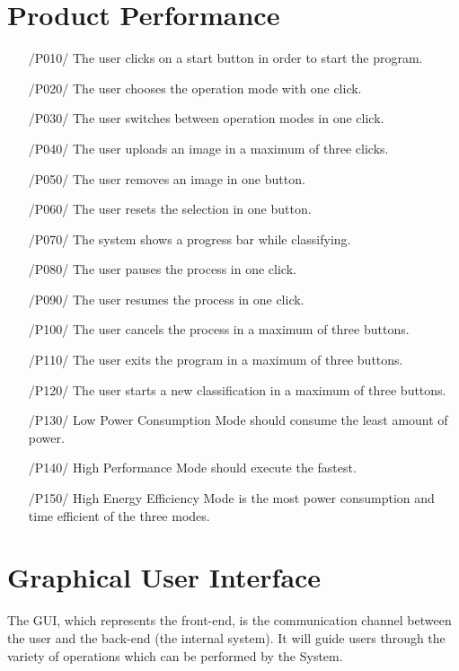 \documentclass[parskip=full]{scrartcl}
\begin{document}
\section{Product Performance}

\begin{itemize}
	\item[/P010/] The user clicks on a start button in order to start the program.
	\item[/P020/] The user chooses the operation mode with one click.
	\item[/P030/] The user switches between operation modes in one click.
	\item[/P040/] The user uploads an image in a maximum of three clicks.
	\item[/P050/] The user removes an image in one button.
	\item[/P060/] The user resets the selection in one button.
	\item[/P070/] The system shows a progress bar while classifying.
	\item[/P080/] The user pauses the process in one click.
	\item[/P090/] The user resumes the process in one click.
	\item[/P100/] The user cancels the process in a maximum of three buttons.
	\item[/P110/] The user exits the program in a maximum of three buttons.
	\item[/P120/] The user starts a new classification in a maximum of three buttons.
	\item[/P130/] Low Power Consumption Mode should consume the least amount of power.
	\item[/P140/] High Performance Mode should execute the fastest.
	\item[/P150/] High Energy Efficiency Mode is the most power consumption and time efficient of the three modes.
\end{itemize}

\pagebreak






\section {Graphical User Interface}

The GUI, which represents the front-end, is the communication channel between the user and the back-end (the internal system). It will guide users through the variety of operations which can be performed by the System.
\end{document}
